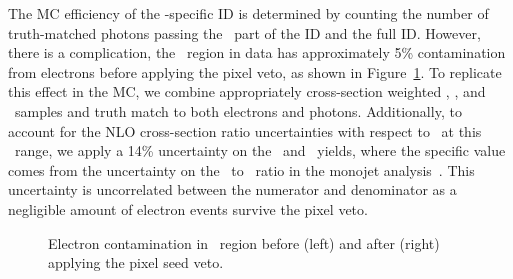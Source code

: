 The MC efficiency of the \Pgg-specific ID is determined by counting the number of truth-matched photons passing the \egamma\ part of the ID and the full ID. 
However, there is a complication, the \gj\ region in data has approximately 5\% contamination from electrons before applying the pixel veto, as shown in Figure~\ref{fig:pvsf_contam}. 
To replicate this effect in the MC, we combine appropriately cross-section weighted \gj, \wj, and \ttbar\ samples and truth match to both electrons and photons. 
Additionally, to account for the NLO cross-section ratio uncertainties with respect to \gj\ at this \pt\ range, we apply a 14\% uncertainty on the \wj\ and \ttbar\ yields, where the specific value comes from the uncertainty on the \gj\ to \wj\ ratio in the monojet analysis~\cite{}.
This uncertainty is uncorrelated between the numerator and denominator as a negligible amount of electron events survive the pixel veto.

\begin{figure}[htbp]
  \centering
  \caption{
    Electron contamination in \gj\ region before (left) and after (right) applying the pixel seed veto.
  }
  \label{fig:pvsf_contam}
\end{figure}
 
